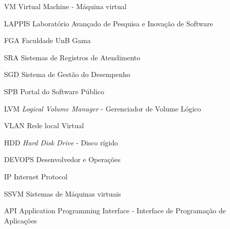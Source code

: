 \begin{siglas}
  \item[VM] Virtual Machine - Máquina virtual
  \item[LAPPIS] Laboratório Avançado de Pesquisa e Inovação de Software
  \item[FGA] Faculdade UnB Gama
  \item[SRA] Sistemas de Registros de Atendimento
  \item[SGD] Sistema de Gestão do Desempenho
  \item[SPB] Portal do Software Público
  \item[LVM] \textit{Logical Volume Manager} - Gerenciador de Volume Lógico
  \item[VLAN] Rede local Virtual
  \item[HDD] \textit{Hard Disk Drive} - Disco rígido
  \item[DEVOPS] Desenvolvedor e Operações
  \item[IP] Internet Protocol
  \item [SSVM] Sistemas de Máquinas virtuais
  \item [API] Application Programming Interface - Interface de Programação de Aplicações 
\end{siglas}
